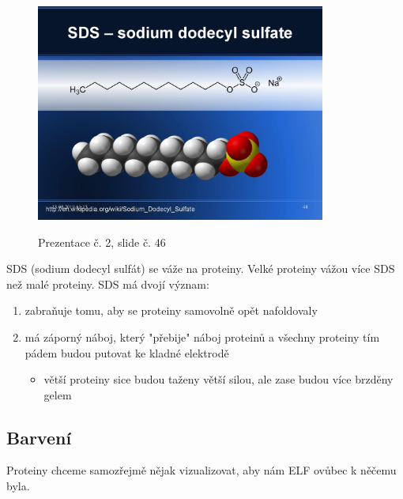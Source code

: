 \documentclass[DIV=8]{scrreprt}
\begin{document}
\begin{figure}
    \caption{Prezentace č. 2, slide č. 46}
    \includegraphics[width=0.85\textwidth]{slides-2/slide-46.jpg}
    \centering
    \label{slides-2-slide-46}
\end{figure}

SDS (sodium dodecyl sulfát) se váže na proteiny. Velké proteiny vážou více SDS než malé proteiny. SDS má dvojí význam:
\begin{enumerate}[nosep]
    \item zabraňuje tomu, aby se proteiny samovolně opět nafoldovaly
    \item má záporný náboj, který "přebije" náboj proteinů a všechny proteiny tím pádem budou putovat ke kladné elektrodě
\begin{itemize}[nosep]
    \item větší proteiny sice budou taženy větší silou, ale zase budou více brzděny gelem
\end{itemize}

\end{enumerate}



\subsection{Barvení} \label{Barvení}


Proteiny chceme samozřejmě nějak vizualizovat, aby nám ELF ovůbec k něčemu byla.
\end{document}

